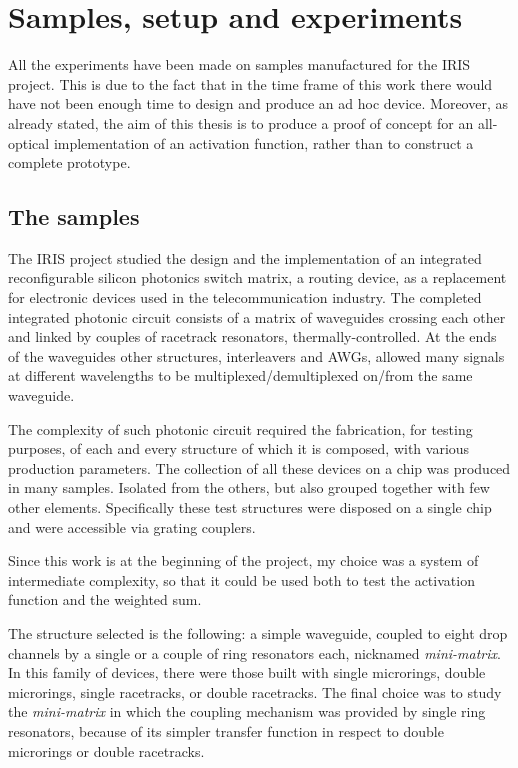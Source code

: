 \chapter{Samples, setup and experiments}
\label{ch:experiments}

All the experiments have been made on samples manufactured for the IRIS project.
This is due to the fact that in the time frame of this work there would have not been enough time to design and produce an ad hoc device.
Moreover, as already stated, the aim of this thesis is to produce a proof of concept for an all-optical implementation of an activation function, rather than to construct a complete prototype.

\section{The samples}
The IRIS project studied the design and the implementation of an integrated reconfigurable silicon photonics switch matrix, a routing device, as a replacement for electronic devices used in the telecommunication industry.
The completed integrated photonic circuit consists of a matrix of waveguides crossing each other and linked by couples of racetrack resonators, thermally-controlled.
At the ends of the waveguides other structures, interleavers and AWGs, allowed many signals at different wavelengths to be multiplexed/demultiplexed on/from the same waveguide.

The complexity of such photonic circuit required the fabrication, for testing purposes, of each and every structure of which it is composed, with various production parameters.
The collection of all these devices on a chip was produced in many samples.
Isolated from the others, but also grouped together with few other elements.
Specifically these test structures were disposed on a single chip and were accessible via grating couplers.


Since this work is at the beginning of the project, my choice was a system of intermediate complexity, so that it could be used both to test the activation function and the weighted sum.

The structure selected is the following: a simple waveguide, coupled to eight drop channels by a single or a couple of ring resonators each, nicknamed \textit{mini-matrix}.
In this family of devices, there were those built with single microrings, double microrings, single racetracks, or double racetracks.
The final choice was to study the \textit{mini-matrix} in which the coupling mechanism was provided by single ring resonators, because of its simpler transfer function in respect to double microrings or double racetracks.

